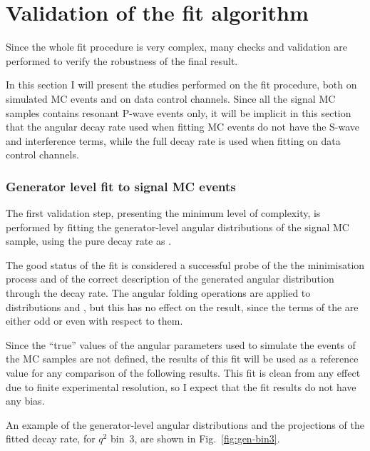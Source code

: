 \chapter{Validation of the fit algorithm}
\label{sec:validation}

Since the whole fit procedure is very complex, many checks and validation are performed to verify the robustness of the final result.

In this section I will present the studies performed on the fit procedure, both on simulated MC events and on data control channels.
Since all the signal MC samples contains resonant P-wave events only, it will be implicit in this section that the angular decay rate used when fitting MC events do not have the S-wave and interference terms, while the full decay rate is used when fitting on data control channels.

\subsection{Generator level fit to signal MC events}
\label{sec:fitval-gen}

The first validation step, presenting the minimum level of complexity, is performed by fitting the generator-level angular distributions of the signal MC sample, using the pure decay rate as \pdf.

The good status of the fit is considered a successful probe of the the minimisation process and of the correct description of the generated angular distribution through the decay rate.
The angular folding operations are applied to distributions and \pdfs, but this has no effect on the result, since the terms of the \pdf are either odd or even with respect to them.

Since the ``true'' values of the angular parameters used to simulate the events of the MC samples are not defined, the results of this fit will be used as a reference value for any comparison of the following results.
This fit is clean from any effect due to finite experimental resolution, so I expect that the fit results do not have any bias.

An example of the generator-level angular distributions and the projections of the fitted decay rate, for $q^2$ bin~3, are shown in Fig.~\ref{fig:gen-bin3}.



